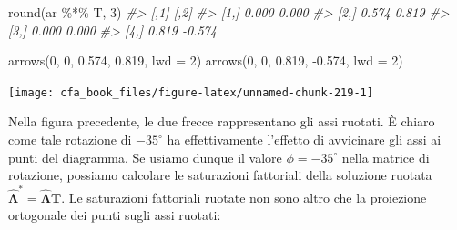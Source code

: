 \documentclass[
  11pt,
]{krantz}
\makeatletter
\newenvironment{Shaded}{\begin{snugshade}}{\end{snugshade}}
\newcommand{\AttributeTok}[1]{\textcolor[rgb]{0.61,0.61,0.61}{#1}}
\newcommand{\CommentTok}[1]{\textcolor[rgb]{0.37,0.37,0.37}{\textit{#1}}}
\newcommand{\ConstantTok}[1]{\textcolor[rgb]{0,0,0}{#1}}
\newcommand{\DecValTok}[1]{\textcolor[rgb]{0.06,0.06,0.06}{#1}}
\newcommand{\FloatTok}[1]{\textcolor[rgb]{0.06,0.06,0.06}{#1}}
\newcommand{\FunctionTok}[1]{\textcolor[rgb]{0,0,0}{#1}}
\newcommand{\NormalTok}[1]{#1}
\newcommand{\OtherTok}[1]{\textcolor[rgb]{0.37,0.37,0.37}{#1}}
\newcommand{\SpecialCharTok}[1]{\textcolor[rgb]{0,0,0}{#1}}
\newenvironment{kframe}{%
\medskip{}
\setlength{\fboxsep}{.8em}
 \def\at@end@of@kframe{}%
 \ifinner\ifhmode%
  \def\at@end@of@kframe{\end{minipage}}%
  \begin{minipage}{\columnwidth}%
 \fi\fi%
 \def\FrameCommand##1{\hskip\@totalleftmargin \hskip-\fboxsep
 \colorbox{shadecolor}{##1}\hskip-\fboxsep
     \hskip-\linewidth \hskip-\@totalleftmargin \hskip\columnwidth}%
 \MakeFramed {\advance\hsize-\width
   \@totalleftmargin\z@ \linewidth\hsize
   \@setminipage}}%
 {\par\unskip\endMakeFramed%
 \at@end@of@kframe}
\renewenvironment{Shaded}{\begin{kframe}}{\end{kframe}}
\theoremstyle{definition}
\theoremstyle{definition}
\theoremstyle{definition}
\theoremstyle{definition}
\theoremstyle{remark}
\makeatother
\begin{document}
\begin{Shaded}
\begin{Highlighting}[]
\FunctionTok{round}\NormalTok{(ar }\SpecialCharTok{\%*\%}\NormalTok{ T, }\DecValTok{3}\NormalTok{)}
\CommentTok{\#\textgreater{}       [,1]   [,2]}
\CommentTok{\#\textgreater{} [1,] 0.000  0.000}
\CommentTok{\#\textgreater{} [2,] 0.574  0.819}
\CommentTok{\#\textgreater{} [3,] 0.000  0.000}
\CommentTok{\#\textgreater{} [4,] 0.819 {-}0.574}

\FunctionTok{arrows}\NormalTok{(}\DecValTok{0}\NormalTok{, }\DecValTok{0}\NormalTok{, }\FloatTok{0.574}\NormalTok{, }\FloatTok{0.819}\NormalTok{, }\AttributeTok{lwd =} \DecValTok{2}\NormalTok{)}
\FunctionTok{arrows}\NormalTok{(}\DecValTok{0}\NormalTok{, }\DecValTok{0}\NormalTok{, }\FloatTok{0.819}\NormalTok{, }\SpecialCharTok{{-}}\FloatTok{0.574}\NormalTok{, }\AttributeTok{lwd =} \DecValTok{2}\NormalTok{)}
\end{Highlighting}
\end{Shaded}

\begin{center}\texttt{[image: cfa\_book\_files/figure-latex/unnamed-chunk-219-1]} \end{center}

Nella figura precedente, le due frecce rappresentano gli assi ruotati. È chiaro come tale rotazione di \(-35^{\circ}\) ha effettivamente l'effetto di avvicinare gli assi ai punti del diagramma. Se usiamo dunque il valore \(\phi = -35^{\circ}\) nella matrice di rotazione, possiamo calcolare le saturazioni fattoriali della soluzione ruotata \(\hat{\boldsymbol{\Lambda}}^* = \hat{\boldsymbol{\Lambda}} \textbf{T}\). Le saturazioni fattoriali ruotate non sono altro che la proiezione ortogonale dei punti sugli assi ruotati:

\begin{Shaded}
\end{Shaded}
\end{document}
